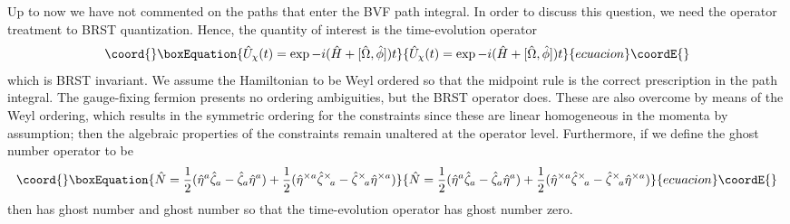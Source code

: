 \documentclass[a4paper,10pt]{article}
\begin{document}
Up to now we have not commented on the paths that enter the BVF path integral. In order 
to discuss this question, we need the operator treatment to BRST quantization. Hence, the 
quantity of interest is the time-evolution operator
\begin{equation}\coord{}\boxEquation{
\hat{U}_{\chi}(t)=\exp -i(\hat{H}+[\hat{\Omega},\hat{\phi}])t
}{
\hat{U}_{\chi}(t)=\exp -i(\hat{H}+[\hat{\Omega},\hat{\phi}])t
}{ecuacion}\coordE{}\end{equation}
which is BRST invariant. We assume the Hamiltonian \coordHE{} to be Weyl ordered so that 
the midpoint rule is the correct prescription in the path integral. The gauge-fixing 
fermion presents no ordering ambiguities, but the BRST operator does. These are also 
overcome by means of the Weyl ordering, which results in the symmetric ordering for the 
constraints \coordHE{} since these are linear homogeneous in the momenta by 
assumption; then the algebraic properties of the constraints remain unaltered at the 
operator level. Furthermore, if we define the ghost number operator to be 
\begin{equation}\coord{}\boxEquation{
\hat{N}=\frac{1}{2}(\hat{\eta}^a\hat{\zeta}_a-\hat{\zeta}_a\hat{\eta}^a)+
\frac{1}{2}(\hat{\eta}^{\times a}\hat{\zeta}^{\times}{\!}_a-
\hat{\zeta}^{\times}{\!}_a\hat{\eta}^{\times a})
}{
\hat{N}=\frac{1}{2}(\hat{\eta}^a\hat{\zeta}_a-\hat{\zeta}_a\hat{\eta}^a)+
\frac{1}{2}(\hat{\eta}^{\times a}\hat{\zeta}^{\times}{\!}_a-
\hat{\zeta}^{\times}{\!}_a\hat{\eta}^{\times a})
}{ecuacion}\coordE{}\end{equation}
then \myHighlight{$\hat{\Omega}$}\coordHE{} has ghost number \coordHE{} and \myHighlight{$\hat{\phi}$}\coordHE{} ghost number \coordHE{} so that the 
time-evolution operator has ghost number zero. 
\end{document}
